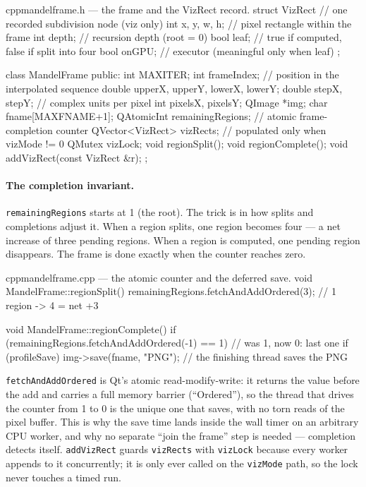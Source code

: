 \documentclass[
	english,
	letterpaper, oneside
]{article}
\begin{document}
\begin{sourcecode}{cpp}{mandelframe.h --- the frame and the VizRect record.}
struct VizRect {              // one recorded subdivision node (viz only)
  int  x, y, w, h;            // pixel rectangle within the frame
  int  depth;                 // recursion depth (root = 0)
  bool leaf;                  // true if computed, false if split into four
  bool onGPU;                 // executor (meaningful only when leaf)
};

class MandelFrame {
public:
    int MAXITER;
    int frameIndex;                  // position in the interpolated sequence
    double upperX, upperY, lowerX, lowerY;
    double stepX, stepY;             // complex units per pixel
    int pixelsX, pixelsY;
    QImage *img;
    char fname[MAXFNAME+1];
    QAtomicInt remainingRegions;     // atomic frame-completion counter
    QVector<VizRect> vizRects;       // populated only when vizMode != 0
    QMutex vizLock;
    void regionSplit();
    void regionComplete();
    void addVizRect(const VizRect &r);
};
\end{sourcecode}

\paragraph{The completion invariant.} \texttt{remainingRegions} starts at 1 (the
root). The trick is in how splits and completions adjust it. When a region splits,
one region becomes four --- a net increase of three pending regions. When a region
is computed, one pending region disappears. The frame is done exactly when the
counter reaches zero.

\begin{sourcecode}{cpp}{mandelframe.cpp --- the atomic counter and the deferred save.}
void MandelFrame::regionSplit() {
  remainingRegions.fetchAndAddOrdered(3);   // 1 region -> 4 = net +3
}

void MandelFrame::regionComplete() {
  if (remainingRegions.fetchAndAddOrdered(-1) == 1) {  // was 1, now 0: last one
     if (profileSave)
       img->save(fname, "PNG");             // the finishing thread saves the PNG
  }
}
\end{sourcecode}

\texttt{fetchAndAddOrdered} is Qt's atomic read-modify-write: it returns the value
before the add and carries a full memory barrier (``Ordered''), so the
thread that drives the counter from 1 to 0 is the unique one that saves, with no
torn reads of the pixel buffer. This is why the save time lands inside the wall
timer on an arbitrary CPU worker, and why no separate ``join the frame'' step is
needed --- completion detects itself. \texttt{addVizRect} guards \texttt{vizRects}
with \texttt{vizLock} because every worker appends to it concurrently; it is only
ever called on the \texttt{vizMode} path, so the lock never touches a timed run.
\end{document}
